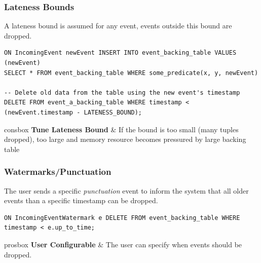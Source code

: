 \subsubsection{Lateness Bounds}
A lateness bound is assumed for any event, events outside this bound are dropped.
\begin{verbatim}
ON IncomingEvent newEvent INSERT INTO event_backing_table VALUES (newEvent)
SELECT * FROM event_backing_table WHERE some_predicate(x, y, newEvent)

-- Delete old data from the table using the new event's timestamp
DELETE FROM event_a_backing_table WHERE timestamp < (newEvent.timestamp - LATENESS_BOUND);
\end{verbatim}
\begin{tabbox}[.7\textwidth]{consbox}
    \textbf{Tune Lateness Bound} & If the bound is too small (many tuples dropped), too large and memory resource becomes pressured by large backing table \\
\end{tabbox}

\subsubsection{Watermarks/Punctuation}
The user sends a specific \textit{punctuation} event to inform the system that all older events than a specific timestamp can be dropped.
\begin{verbatim}
ON IncomingEventWatermark e DELETE FROM event_backing_table WHERE timestamp < e.up_to_time;
\end{verbatim}
\begin{tabbox}[.7\textwidth]{prosbox}
    \textbf{User Configurable} & The user can specify when events should be dropped. \\
\end{tabbox}

